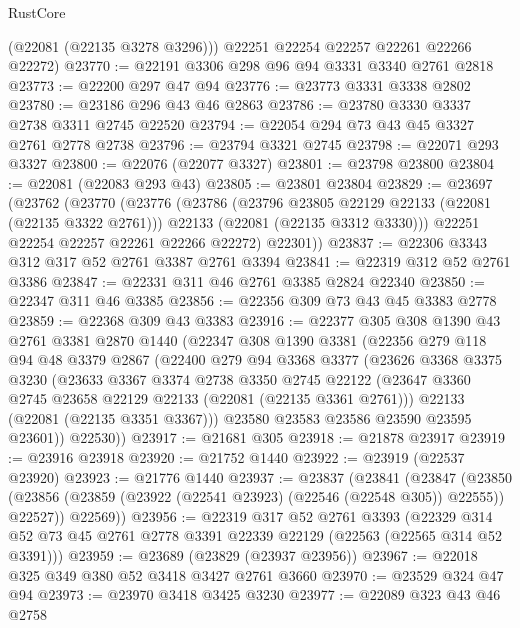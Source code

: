 \begin{lexlean}{RustCore}
\begin{coremodule}
        (@22081 (@22135 @3278 @3296)))
      @22251
      @22254
      @22257
      @22261
      @22266
      @22272)
@23770 := @22191 @3306 @298 @96 @94 @3331 @3340 @2761 @2818
@23773 := @22200 @297 @47 @94
@23776 := @23773 @3331 @3338 @2802
@23780 := @23186 @296 @43 @46 @2863
@23786 := @23780 @3330 @3337 @2738 @3311 @2745 @22520
@23794 := @22054 @294 @73 @43 @45 @3327 @2761 @2778 @2738
@23796 := @23794 @3321 @2745
@23798 := @22071 @293 @3327
@23800 := @22076 (@22077 @3327)
@23801 := @23798 @23800
@23804 := @22081 (@22083 @293 @43)
@23805 := @23801 @23804
@23829 := @23697
    (@23762
      (@23770
        (@23776
          (@23786
            (@23796 @23805 @22129 @22133 (@22081 (@22135 @3322 @2761)))
            @22133
            (@22081 (@22135 @3312 @3330)))
          @22251
          @22254
          @22257
          @22261
          @22266
          @22272)
        @22301))
@23837 := @22306 @3343 @312 @317 @52 @2761 @3387 @2761 @3394
@23841 := @22319 @312 @52 @2761 @3386
@23847 := @22331 @311 @46 @2761 @3385 @2824 @22340
@23850 := @22347 @311 @46 @3385
@23856 := @22356 @309 @73 @43 @45 @3383 @2778
@23859 := @22368 @309 @43 @3383
@23916 := @22377
    @305
    @308
    @1390
    @43
    @2761
    @3381
    @2870
    @1440
    (@22347
      @308
      @1390
      @3381
      (@22356
        @279
        @118
        @94
        @48
        @3379
        @2867
        (@22400
          @279
          @94
          @3368
          @3377
          (@23626
            @3368
            @3375
            @3230
            (@23633
              @3367
              @3374
              @2738
              @3350
              @2745
              @22122
              (@23647 @3360 @2745 @23658 @22129 @22133 (@22081 (@22135 @3361 @2761)))
              @22133
              (@22081 (@22135 @3351 @3367)))
            @23580
            @23583
            @23586
            @23590
            @23595
            @23601))
        @22530))
@23917 := @21681 @305
@23918 := @21878 @23917
@23919 := @23916 @23918
@23920 := @21752 @1440
@23922 := @23919 (@22537 @23920)
@23923 := @21776 @1440
@23937 := @23837
    (@23841
      (@23847
        (@23850 (@23856 (@23859 (@23922 (@22541 @23923) (@22546 (@22548 @305)) @22555)) @22527))
        @22569))
@23956 := @22319
    @317
    @52
    @2761
    @3393
    (@22329 @314 @52 @73 @45 @2761 @2778 @3391 @22339 @22129 (@22563 (@22565 @314 @52 @3391)))
@23959 := @23689 (@23829 (@23937 @23956))
@23967 := @22018 @325 @349 @380 @52 @3418 @3427 @2761 @3660
@23970 := @23529 @324 @47 @94
@23973 := @23970 @3418 @3425 @3230
@23977 := @22089 @323 @43 @46 @2758

\end{coremodule}
\end{lexlean}
